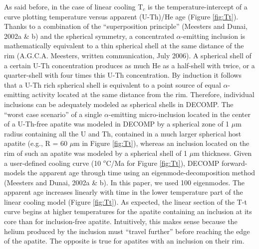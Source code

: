 \documentclass{article}
\begin{document}
As  said  before,  in  the   case  of  linear  cooling  T$_c$  is  the
temperature-intercept of a  curve plotting temperature versus apparent
(U-Th)/He age  (Figure \ref{fig:Tt}).  Thanks to a  combination of the
``superposition principle''  (Meesters and Dunai, 2002a \&  b) and the
spherical  symmetry,  a  concentrated $\alpha$-emitting  inclusion  is
mathematically  equivalent  to a  thin  spherical  shell  at the  same
distance of  the rim  (A.G.C.A. Meesters, written  communication, July
2006).  A spherical shell of  a certain U-Th concentration produces as
much He as a half-shell with twice, or a quarter-shell with four times
this U-Th  concentration.  By  induction it follows  that a  U-Th rich
spherical   shell  is   equivalent  to   a  point   source   of  equal
$\alpha$-emitting activity located at the  same distance from the rim. 
Therefore,  individual   inclusions  can  be   adequately  modeled  as
spherical shells in  DECOMP.  The ``worst case scenario''  of a single
$\alpha$-emitting micro-inclusion located in the center of a U-Th-free
apatite was modeled  in DECOMP by a spherical zone  of 1 $\mu$m radius
containing all the U and Th, contained in a much larger spherical host
apatite  (e.g., R  = 60  $\mu$m  in Figure  \ref{fig:Tt}), whereas  an
inclusion  located on  the rim  of such  an apatite  was modeled  by a
spherical shell  of 1 $\mu$m thickness.  Given  a user-defined cooling
curve (10 $^o$C/Ma for Figure \ref{fig:Tt}), DECOMP forward-models the
apparent  age  through time  using  an eigenmode-decomposition  method
(Meesters  and  Dunai,  2002a \&  b).   In  this  paper, we  used  100
eigenmodes.   The apparent  age increases  linearly with  time  in the
lower   temperature  part   of  the   linear  cooling   model  (Figure
\ref{fig:Tt}).   As expected,  the  linear section  of  the T-t  curve
begins at higher temperatures  for the apatite containing an inclusion
at its core than  for inclusion-free apatite.  Intuitively, this makes
sense  because the  helium  produced by  the  inclusion must  ``travel
further'' before  reaching the edge  of the apatite.  The  opposite is
true for apatites with an inclusion on their rim.
\\
\end{document}
